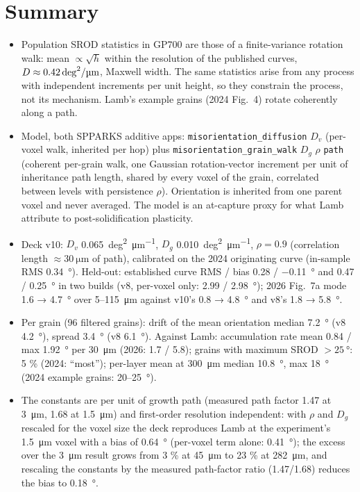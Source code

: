 \documentclass[11pt,a4paper]{article}
\newcommand{\code}[1]{\texttt{#1}}
\newcommand{\Dunit}{\si{deg\squared\per\micro\metre}}
\begin{document}
\section{Summary}
\begin{itemize}
\item Population SROD statistics in GP700 are those of a finite-variance rotation walk: mean $\propto \sqrt{h}$ within the resolution of the published curves, $D \approx \SI{0.42}{\Dunit}$, Maxwell width. The same statistics arise from any process with independent increments per unit height, so they constrain the process, not its mechanism. Lamb's example grains (2024 Fig.~4) rotate coherently along a path.
\item Model, both SPPARKS additive apps: \code{misorientation\_diffusion} $D_v$ (per-voxel walk, inherited per hop) plus \code{misorientation\_grain\_walk} $D_g$ $\rho$ \code{path} (coherent per-grain walk, one Gaussian rotation-vector increment per unit of inheritance path length, shared by every voxel of the grain, correlated between levels with persistence $\rho$). Orientation is inherited from one parent voxel and never averaged. The model is an at-capture proxy for what Lamb attribute to post-solidification plasticity.
\item Deck v10: $D_v$ \SI{0.065}{\Dunit}, $D_g$ \SI{0.010}{\Dunit}, $\rho = 0.9$ (correlation length $\approx \SI{30}{\micro\metre}$ of path), calibrated on the 2024 originating curve (in-sample RMS \SI{0.34}{\degree}). Held-out: established curve RMS / bias 0.28 / \SI{-0.11}{\degree} and 0.47 / \SI{+0.25}{\degree} in two builds (v8, per-voxel only: 2.99 / \SI{+2.98}{\degree}); 2026 Fig.~7a mode 1.6 → \SI{4.7}{\degree} over 5--\SI{115}{\micro\metre} against v10's 0.8 → \SI{4.8}{\degree} and v8's 1.8 → \SI{5.8}{\degree}.
\item Per grain (96 filtered grains): drift of the mean orientation median \SI{7.2}{\degree} (v8 \SI{4.2}{\degree}), spread \SI{3.4}{\degree} (v8 \SI{6.1}{\degree}). Against Lamb: accumulation rate mean 0.84 / max \SI{1.92}{\degree} per \SI{30}{\micro\metre} (2026: 1.7 / 5.8); grains with maximum SROD $> \SI{25}{\degree}$: 5 \% (2024: ``most''); per-layer mean at \SI{300}{\micro\metre} median \SI{10.8}{\degree}, max \SI{18}{\degree} (2024 example grains: 20--\SI{25}{\degree}).
\item The constants are per unit of growth path (measured path factor 1.47 at \SI{3}{\micro\metre}, 1.68 at \SI{1.5}{\micro\metre}) and first-order resolution independent: with $\rho$ and $D_g$ rescaled for the voxel size the deck reproduces Lamb at the experiment's \SI{1.5}{\micro\metre} voxel with a bias of \SI{+0.64}{\degree} (per-voxel term alone: \SI{+0.41}{\degree}); the excess over the \SI{3}{\micro\metre} result grows from 3 \% at \SI{45}{\micro\metre} to 23 \% at \SI{282}{\micro\metre}, and rescaling the constants by the measured path-factor ratio (1.47/1.68) reduces the bias to \SI{+0.18}{\degree}.

\end{itemize}
\end{document}
